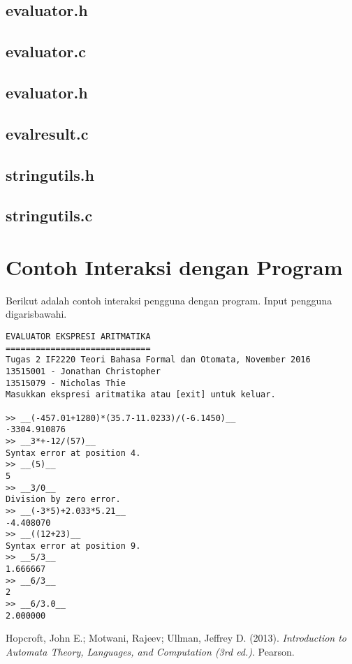 \documentclass[a4paper,titlepage]{article}
\begin{document}
		\subsection{evaluator.h}
			

		\subsection{evaluator.c}
			

		\subsection{evaluator.h}
			

		\subsection{evalresult.c}
			

		\subsection{stringutils.h}
			

		\subsection{stringutils.c}
			

	\section{Contoh Interaksi dengan Program}

		Berikut adalah contoh interaksi pengguna dengan program. Input pengguna digarisbawahi.

		\begin{lstlisting}
EVALUATOR EKSPRESI ARITMATIKA
=============================
Tugas 2 IF2220 Teori Bahasa Formal dan Otomata, November 2016
13515001 - Jonathan Christopher
13515079 - Nicholas Thie
Masukkan ekspresi aritmatika atau [exit] untuk keluar.

>> __(-457.01+1280)*(35.7-11.0233)/(-6.1450)__
-3304.910876
>> __3*+-12/(57)__
Syntax error at position 4.
>> __(5)__
5
>> __3/0__
Division by zero error.
>> __(-3*5)+2.033*5.21__
-4.408070
>> __((12+23)__
Syntax error at position 9.
>> __5/3__
1.666667
>> __6/3__
2
>> __6/3.0__
2.000000
	\end{lstlisting}

	\begin{thebibliography}{9}

		Hopcroft, John E.; Motwani, Rajeev; Ullman, Jeffrey D.
		(2013).
		\textit{Introduction to Automata Theory, Languages, and Computation (3rd ed.)}.
		Pearson.

	\end{thebibliography}
\end{document}
